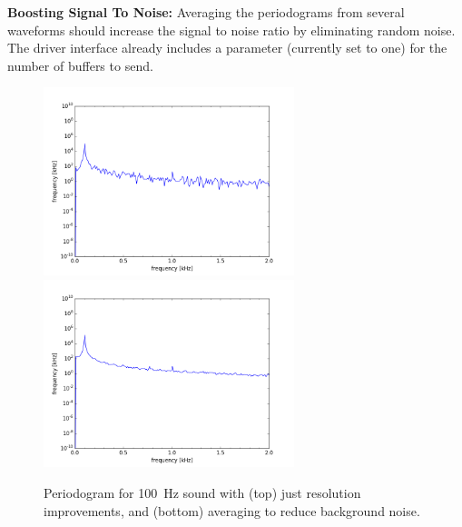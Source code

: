 \documentclass[12pt]{article}
\begin{document}
\noindent
{\bf Boosting Signal To Noise:}  Averaging the periodograms from several waveforms should increase the signal to noise ratio by eliminating random noise.  The driver interface already includes a parameter (currently set to one) for the number of buffers to send.

\begin{figure}[htbp]
\begin{center}
{\includegraphics[width=0.65\textwidth]{figs/res100hz.png}} \\
{\includegraphics[width=0.65\textwidth]{figs/avg100hz.png}}
\end{center}
\caption{\label{fig:periodogram} Periodogram for 100~Hz sound with (top) just resolution improvements, and (bottom) averaging to reduce background noise. }
\end{figure}
\end{document}
